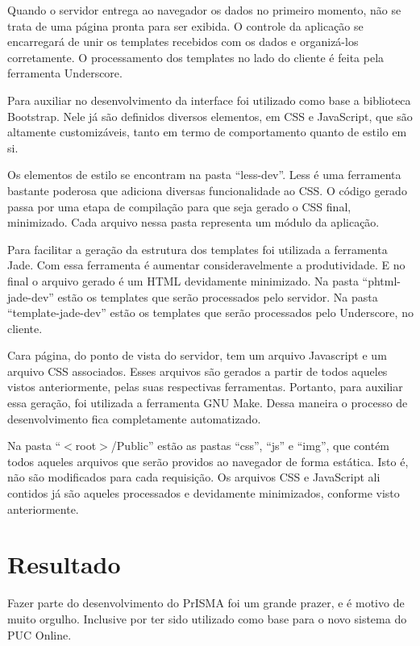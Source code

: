 \documentclass[graduacao,brazil]{ThesisPUC}
\begin{document}
Quando o servidor entrega ao navegador os dados no primeiro momento, não se trata de uma página pronta para ser exibida. O controle da aplicação se encarregará de unir os templates recebidos com os dados e organizá-los corretamente. O processamento dos templates no lado do cliente é feita pela ferramenta Underscore\cite{Underscore}.

Para auxiliar no desenvolvimento da interface foi utilizado como base a biblioteca Bootstrap\cite{Bootstrap}. Nele já são definidos diversos elementos, em CSS e JavaScript, que são altamente customizáveis, tanto em termo de comportamento quanto de estilo em si.

Os elementos de estilo se encontram na pasta “less-dev”. Less\cite{Less} é uma ferramenta bastante poderosa que adiciona diversas funcionalidade ao CSS. O código gerado passa por uma etapa de compilação para que seja gerado o CSS final, minimizado. Cada arquivo nessa pasta representa um módulo da aplicação.

Para facilitar a geração da estrutura dos templates foi utilizada a ferramenta Jade\cite{Jade}. Com essa ferramenta é aumentar consideravelmente a produtividade. E no final o arquivo gerado é um HTML devidamente minimizado. Na pasta “phtml-jade-dev” estão os templates que serão processados pelo servidor. Na pasta “template-jade-dev” estão os templates que serão processados pelo Underscore\cite{Underscore}, no cliente.

Cara página, do ponto de vista do servidor, tem um arquivo Javascript e um arquivo CSS associados. Esses arquivos são gerados a partir de todos aqueles vistos anteriormente, pelas suas respectivas ferramentas. Portanto, para auxiliar essa geração, foi utilizada a ferramenta GNU Make. Dessa maneira o processo de desenvolvimento fica completamente automatizado.

Na pasta “$<$root$>$/Public” estão as pastas “css”, “js” e “img”, que contém todos aqueles arquivos que serão providos ao navegador de forma estática. Isto é, não são modificados para cada requisição. Os arquivos CSS e JavaScript ali contidos já são aqueles processados e devidamente minimizados, conforme visto anteriormente.

\chapter{Resultado}

Fazer parte do desenvolvimento do PrISMA foi um grande prazer, e é motivo de muito orgulho. Inclusive por ter sido utilizado como base para o novo sistema do PUC Online.
\end{document}
